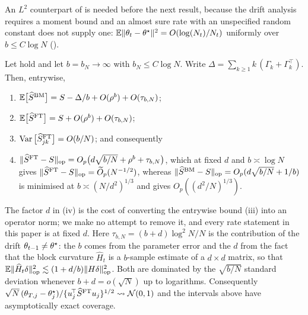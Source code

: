An $L^2$ counterpart of  is needed before the next result, because the drift analysis
requires a moment bound and an almost sure rate with an unspecified random constant does not supply one:
$\mathbb{E}\lVert \theta_t-\theta^\star \rVert^2=O(\log(N_t)/N_t)$ uniformly over $b\le C\log N$ ().

\begin{theorem}
\label{thm:lrv}
Let  hold and let $b=b_N\to\infty$ with
$b_N\le C\log N$.
Write $\Delta=\sum_{k\ge1}k\,(\Gamma_k+\Gamma_k^{\!\top})$. Then, entrywise,
\begin{enumerate}[label=(\roman*),leftmargin=1.9em,itemsep=1pt,topsep=1pt]
\item $\mathbb{E}\big[\widehat{S}^{\mathrm{BM}}\big]=S-\Delta/b+O(\rho^{b})+O(\tau_{b,N})$;
\item $\mathbb{E}\big[\widehat{S}^{\mathrm{FT}}\big]=S+O(\rho^{b})+O(\tau_{b,N})$;
\item $\operatorname{Var}\big[\widehat{S}^{\mathrm{FT}}_{jk}\big]=O(b/N)$; and consequently
\item $\lVert \widehat{S}^{\mathrm{FT}}-S \rVert_{\mathrm{op}}=O_p\big(d\sqrt{b/N}+\rho^{b}+\tau_{b,N}\big)$, which at fixed $d$
      and $b\asymp\log N$ gives $\lVert \widehat{S}^{\mathrm{FT}}-S \rVert_{\mathrm{op}}=\widetilde O_p(N^{-1/2})$, whereas
      $\lVert \widehat{S}^{\mathrm{BM}}-S \rVert_{\mathrm{op}}=O_p(d\sqrt{b/N}+1/b)$ is minimised at $b\asymp(N/d^2)^{1/3}$ and
      gives $O_p((d^2/N)^{1/3})$.
\end{enumerate}
The factor $d$ in (iv) is the cost of converting the entrywise bound (iii) into an operator
norm; we make no attempt to remove it, and every rate statement in this paper is at fixed
$d$.
Here $\tau_{b,N}=(b+d)\log^2N/N$ is the contribution of the drift $\theta_{t-1}\ne\theta^\star$: the
$b$ comes from the parameter error and the $d$ from the fact that the block curvature
$\widehat H_t$ is a $b$-sample estimate of a $d\times d$ matrix, so that
$\mathbb{E}\lVert \widehat H_t\delta \rVert_{\mathrm{op}}^2\lesssim(1+d/b)\lVert H\delta \rVert_{\mathrm{op}}^2$. Both are dominated by the
$\sqrt{b/N}$ standard deviation whenever $b+d=o(\sqrt{N})$ up to logarithms. Consequently
$\sqrt{N}\,(\theta_{T,j}-\theta^\star_j)/\{u_j^{\!\top}\widehat{S}^{\mathrm{FT}} u_j\}^{1/2}\rightsquigarrow
\mathcal{N}(0,1)$ and the intervals above have asymptotically exact coverage.
\end{theorem}

